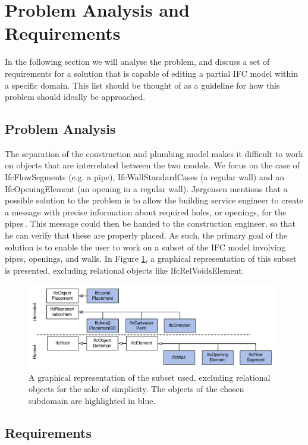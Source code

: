 \section{Problem Analysis and Requirements}
\label{sec:problem_analysis_and_requirements}
In the following section we will analyse the problem, and discuss a set of requirements for a solution that is capable of editing a partial IFC model within a specific domain. This list should be thought of as a guideline for how this problem should ideally be approached.

\subsection{Problem Analysis}
\label{subsec:problem_analysis}
The separation of the construction and plumbing model makes it difficult to work on objects that are interrelated between the two models. We focus on the case of IfcFlowSegments (e.g. a pipe), IfcWallStandardCases (a regular wall) and an IfcOpeningElement (an opening in a regular wall). Jørgensen mentions that a possible solution to the problem is to allow the building service engineer to create a message with precise information about required holes, or openings, for the pipes\,\cite{jorgensen12}. This message could then be handed to the construction engineer, so that he can verify that these are properly placed. As such, the primary goal of the solution is to enable the user to work on a subset of the IFC model involving pipes, openings, and walls. In Figure \ref{fig:ifcheirachy}, a graphical representation of this subset is presented, excluding relational objects like IfcRelVoidsElement.

\begin{figure}[t]
    \centering
        \includegraphics[width=110mm]{images/IfcHeirachy.pdf}
    \caption{A graphical representation of the subset used, excluding relational objects for the sake of simplicity. The objects of the chosen subdomain are highlighted in blue.}
    \label{fig:ifcheirachy}
\end{figure}

\subsection{Requirements}
\label{subsec:requirements}
